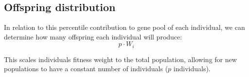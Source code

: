 \subsection{Offspring distribution
}
\nid In relation to this percentile contribution to gene pool of each individual, we can determine how many offspring each individual will produce: 
\begin{equation*}
p \cdot W_i
\end{equation*}

\nid This scales individuals fitness weight to the total population, allowing for new populations to have a constant number of individuals ($p$ individuals). 



























































































